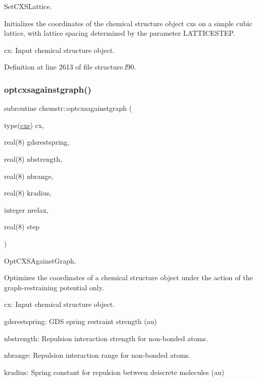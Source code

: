 Set\+C\+X\+S\+Lattice. 

Initializes the coordinates of the chemical structure object cxs on a simple cubic lattice, with lattice spacing determined by the parameter L\+A\+T\+T\+I\+C\+E\+S\+T\+EP.


\begin{DoxyItemize}
\item cx\+: Input chemical structure object. 
\end{DoxyItemize}

Definition at line 2613 of file structure.\+f90.

\mbox{\label{namespacechemstr_a579dfeacef98930d51ce127c936910ce}} 
\subsubsection{\texorpdfstring{optcxsagainstgraph()}{optcxsagainstgraph()}}
{\footnotesize\ttfamily subroutine chemstr\+::optcxsagainstgraph (\begin{DoxyParamCaption}\item[{type(\mbox{\hyperlink{structchemstr_1_1cxs}{cxs}})}]{cx,  }\item[{real(8)}]{gdsrestspring,  }\item[{real(8)}]{nbstrength,  }\item[{real(8)}]{nbrange,  }\item[{real(8)}]{kradius,  }\item[{integer}]{nrelax,  }\item[{real(8)}]{step }\end{DoxyParamCaption})}



Opt\+C\+X\+S\+Against\+Graph. 

Optimizes the coordinates of a chemical structure object under the action of the graph-\/restraining potential only.


\begin{DoxyItemize}
\item cx\+: Input chemical structure object.
\item gdsrestspring\+: G\+DS spring restraint strength (au)
\item nbstrength\+: Repulsion interaction strength for non-\/bonded atoms.
\item nbrange\+: Repulsion interaction range for non-\/bonded atoms.
\item kradius\+: Spring constant for repulsion between deiscrete molecules (au) 
\end{DoxyItemize}

